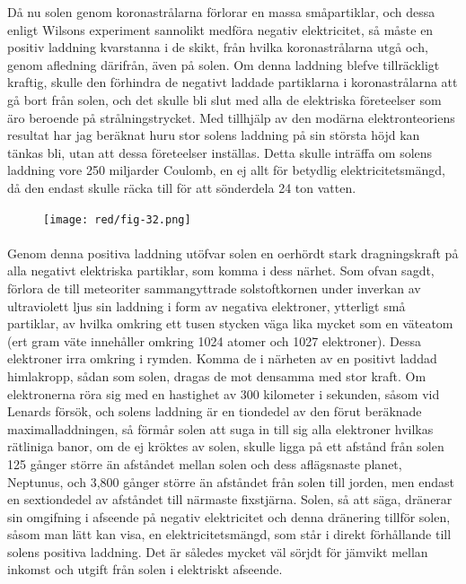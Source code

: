\documentclass[a4paper, 12pt, oneside, swedish]{article}
\begin{document}
Då nu solen genom koronastrålarna förlorar en massa småpartiklar, och dessa enligt Wilsons experiment sannolikt medföra negativ elektricitet, så måste en positiv laddning kvarstanna i de skikt, från hvilka koronastrålarna utgå och, genom afledning därifrån, även på solen. Om denna laddning blefve tillräckligt kraftig, skulle den förhindra de negativt laddade partiklarna i koronastrålarna att gå bort från solen, och det skulle bli slut med alla de elektriska företeelser som äro beroende på strålningstrycket. Med tillhjälp av den modärna elektronteoriens resultat har jag beräknat huru stor solens laddning på sin största höjd kan tänkas bli, utan att dessa företeelser inställas. Detta skulle inträffa om solens laddning vore 250 miljarder Coulomb, en ej allt för betydlig elektricitetsmängd, då den endast skulle räcka till för att sönderdela 24 ton vatten.

\begin{figure}[H]
\centering
\texttt{[image: red/fig-32.png]}
\caption{}
\end{figure}
\paragraph{}
Genom denna positiva laddning utöfvar solen en oerhördt stark dragningskraft på alla negativt elektriska partiklar, som komma i dess närhet. Som ofvan sagdt, förlora de till meteoriter sammangyttrade solstoftkornen under inverkan av ultraviolett ljus sin laddning i form av negativa elektroner, ytterligt små partiklar, av hvilka omkring ett tusen stycken väga lika mycket som en väteatom (ert gram väte innehåller omkring 1024 atomer och 1027 elektroner). Dessa elektroner irra omkring i rymden. Komma de i närheten av en positivt laddad himlakropp, sådan som solen, dragas de mot densamma med stor kraft. Om elektronerna röra sig med en hastighet av 300 kilometer i sekunden, såsom vid Lenards försök, och solens laddning är en tiondedel av den förut beräknade maximalladdningen, så förmår solen att suga in till sig alla elektroner hvilkas rätliniga banor, om de ej kröktes av solen, skulle ligga på ett afstånd från solen 125 gånger större än afståndet mellan solen och dess aflägsnaste planet, Neptunus, och 3,800 gånger större än afståndet från solen till jorden, men endast en sextiondedel av afståndet till närmaste fixstjärna. Solen, så att säga, dränerar sin omgifning i afseende på negativ elektricitet och denna dränering tillför solen, såsom man lätt kan visa, en elektricitetsmängd, som står i direkt förhållande till solens positiva laddning. Det är således mycket väl sörjdt för jämvikt mellan inkomst och utgift från solen i elektriskt afseende.
\end{document}
